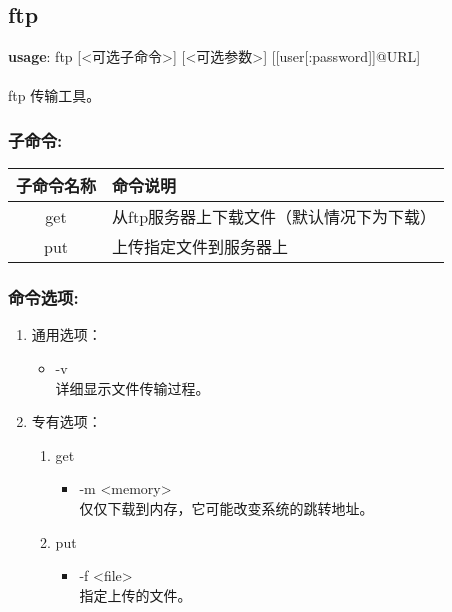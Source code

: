 \subsection{ftp}
\textbf{usage}: ftp [<可选子命令>] [<可选参数>] [[user[:password]]@URL] \\
\\ ftp 传输工具。

\subsubsection{子命令:}
\begin{table}[H]
\setlength{\parindent}{0pt}
\begin{tabular}{|c|l|} \hline
子命令名称 & 命令说明 \\ \hline
get & 从ftp服务器上下载文件（默认情况下为下载）\\ \hline
put & 上传指定文件到服务器上 \\ \hline
\end{tabular}
\end{table}

\subsubsection{命令选项:}
\begin{enumerate}
	\item 通用选项：
	\begin{itemize}
		\item -v \\
		详细显示文件传输过程。
	\end{itemize}

	\item 专有选项：
		\begin{enumerate}
			\item get
			\begin{itemize}
				\item -m <memory> \\
				仅仅下载到内存，它可能改变系统的跳转地址。 %
			\end{itemize}

			\item put
			\begin{itemize}
				\item -f <file> \\
				指定上传的文件。
			\end{itemize}
		\end{enumerate}
\end{enumerate}

